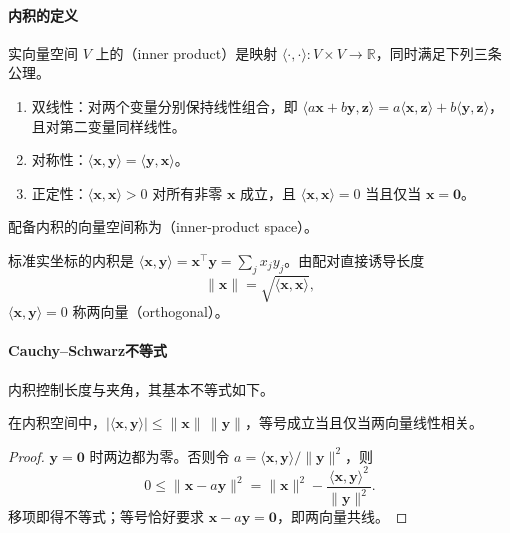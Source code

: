 \paragraph{内积的定义}

\begin{definition}[实内积]
\label{def:linear-algebra-inner-product}
\label{def:functional-inner-product-space}
实向量空间 $V$ 上的（inner product）是映射 $\langle\cdot,\cdot\rangle:V\times V\to\mathbb R$，同时满足下列三条公理。
\begin{enumerate}
 \item 双线性：对两个变量分别保持线性组合，即 $\langle a\bm x+b\bm y,\bm z\rangle=a\langle\bm x,\bm z\rangle+b\langle\bm y,\bm z\rangle$，且对第二变量同样线性。
 \item 对称性：$\langle\bm x,\bm y\rangle=\langle\bm y,\bm x\rangle$。
 \item 正定性：$\langle\bm x,\bm x\rangle>0$ 对所有非零 $\bm x$ 成立，且 $\langle\bm x,\bm x\rangle=0$ 当且仅当 $\bm x=\bm0$。
\end{enumerate}
配备内积的向量空间称为（inner-product space）。
\end{definition}

标准实坐标的内积是 $\langle\bm x,\bm y\rangle=\bm x^\top\bm y=\sum_j x_jy_j$。由配对直接诱导长度
\begin{equation}
 \lVert\bm x\rVert=\sqrt{\langle\bm x,\bm x\rangle},
 \label{eq:linear-algebra-inner-product-norm}
\end{equation}
$\langle\bm x,\bm y\rangle=0$ 称两向量（orthogonal）。

\paragraph{Cauchy--Schwarz不等式}

内积控制长度与夹角，其基本不等式如下。
\begin{theorem}
\label{thm:linear-algebra-cauchy-schwarz}
在内积空间中，$|\langle\bm x,\bm y\rangle|\leq\lVert\bm x\rVert\,\lVert\bm y\rVert$，等号成立当且仅当两向量线性相关。
\end{theorem}
\begin{proof}
$\bm y=\bm0$ 时两边都为零。否则令 $a=\langle\bm x,\bm y\rangle/\lVert\bm y\rVert^2$，则
\[
 0\leq\lVert\bm x-a\bm y\rVert^2
 =\lVert\bm x\rVert^2-\frac{\langle\bm x,\bm y\rangle^2}{\lVert\bm y\rVert^2}.
\]
移项即得不等式；等号恰好要求 $\bm x-a\bm y=\bm0$，即两向量共线。
\end{proof}

